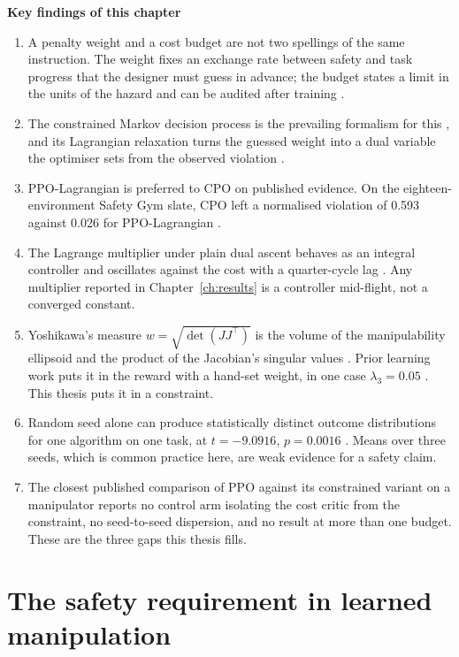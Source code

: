 \begin{keybox}
\textbf{Key findings of this chapter}

\begin{enumerate}\tightlist
\item A penalty weight and a cost budget are not two spellings of the same instruction. The
weight fixes an exchange rate between safety and task progress that the designer must guess in
advance; the budget states a limit in the units of the hazard and can be audited after training
\cite{achiam2017cpo}.
\item The constrained Markov decision process is the prevailing formalism for this
\cite{gu2024review}, and its Lagrangian relaxation turns the guessed weight into a dual variable
the optimiser sets from the observed violation \cite{altman1999cmdp}.
\item PPO-Lagrangian is preferred to CPO on published evidence. On the eighteen-environment
Safety Gym slate, CPO left a normalised violation of 0.593 against 0.026 for PPO-Lagrangian
\cite{ray2019benchmarking}.
\item The Lagrange multiplier under plain dual ascent behaves as an integral controller and
oscillates against the cost with a quarter-cycle lag \cite{stooke2020pid}. Any multiplier
reported in Chapter~\ref{ch:results} is a controller mid-flight, not a converged constant.
\item Yoshikawa's measure \(w=\sqrt{\det(JJ^{\top})}\) is the volume of the manipulability
ellipsoid and the product of the Jacobian's singular values \cite{yoshikawa1985manipulability}.
Prior learning work puts it in the reward with a hand-set weight, in one case
\(\lambda_{3}=0.05\) \cite{shen2022reactive}. This thesis puts it in a constraint.
\item Random seed alone can produce statistically distinct outcome distributions for one
algorithm on one task, at \(t=-9.0916\), \(p=0.0016\) \cite{henderson2018matters}. Means over
three seeds, which is common practice here, are weak evidence for a safety claim.
\item The closest published comparison of PPO against its constrained variant on a manipulator
\cite{khan2026rl_precision_grasping} reports no control arm isolating the cost critic from the
constraint, no seed-to-seed dispersion, and no result at more than one budget. These are the
three gaps this thesis fills.
\end{enumerate}
\end{keybox}

\section{The safety requirement in learned manipulation}\label{sec:b-motivation}

